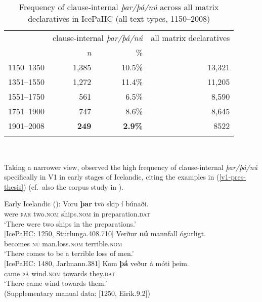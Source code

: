 \documentclass[output=paper,colorlinks,citecolor=brown]{langscibook}
\begin{document}
    \begin{table}
         \setlength{\tabcolsep}{1ex}
        \centering
       
        \begin{tabular}{lrrr}
                \lsptoprule
        & \multicolumn{2}{c}{clause-internal \textit{þar/þá/nú}} & all matrix declaratives  \\
          \cmidrule(lr){2-3} 
      &  \textit{n} & \% &   \\
      \midrule
      1150--1350 & 1,385 & 10.5\% & 13,321 \\
      1351--1550 & 1,272 & 11.4\% &  11,205 \\
      1551--1750 & 561 & 6.5\% & 8,590  \\
      1751--1900 & 747 & 8.6\% &  8,645 \\
      1901--2008 & \textbf{249} & \textbf{2.9\%} & 8522 \\
              \lspbottomrule
        \end{tabular}
        \caption{Frequency of clause-internal \textit{þar/þá/nú} across all matrix declaratives in IcePaHC (all text types, 1150--2008)}\
         \label{tab:rel_freq_dia}
    \end{table}{}    



Taking a narrower view, \citet[260]{booth2018} observed the high frequency of clause-internal \textit{þar/þá/nú} specifically in V1  in early stages of Icelandic, citing the examples in (\ref{v1-pres-thesis}) (cf.~also the corpus study in \citealp{booth-schaetzle:2019-cr}).


\ea Early Icelandic (\citealp[260]{booth2018}):
\label{v1-pres-thesis}
\ea 
\gll Voru \textbf{þar} tvö skip í búnaði.\\
were \textsc{þar} two.\textsc{nom} ships.\textsc{nom} in preparation.\textsc{dat}\\
\glt `There were two ships in the preparations.' \\ \hfill [IcePaHC: 1250, Sturlunga.408.710]
\ex 
\gll Verður \textbf{nú} mannfall ógurligt.\\
becomes \textsc{nú} man.loss.\textsc{nom} terrible.\textsc{nom}\\
\glt `There comes to be a terrible loss of men.' \\ \hfill [IcePaHC: 1480, Jarlmann.381]
\ex 
\gll Kom \textbf{þá} veður {á móti} þeim.\\
came \textsc{þá} wind.\textsc{nom} towards they.\textsc{dat}\\
\glt `There came wind towards them.' \\ \hfill (Supplementary manual data: [1250, Eirik.9.2])
\z 
\z 
\end{document}

